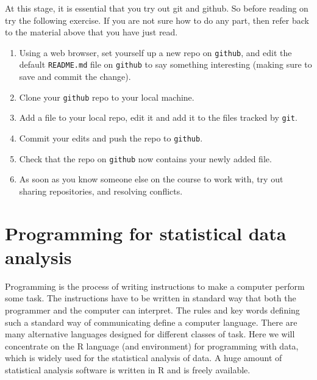 \documentclass[10pt] {article}
\theoremstyle{definition}
\begin{document}
At this stage, it is essential that you try out git and github. So before reading on try the following exercise. If you are not sure how to do any part, then refer back to the material above that you have just read.
\begin{enumerate}
\item Using a web browser, set yourself up a new repo on {\tt github}, and edit the default {\tt README.md} file on {\tt github} to say something interesting (making sure to save and commit the change).
\item Clone your {\tt github} repo to your local machine.
\item Add a file to your local repo, edit it and add it to the files tracked by {\tt git}.
\item Commit your edits and push the repo to {\tt github}.
\item Check that the repo on {\tt github} now contains your newly added file. 
\item As soon as you know someone else on the course to work with, try out sharing repositories, and resolving conflicts.
\end{enumerate}


\section{Programming for statistical data analysis}

Programming is the process of writing instructions to make a computer perform some task. The instructions have to be written in standard way that both the programmer and the computer can interpret. The rules and key words defining such a standard way of communicating define a computer language. There are many alternative languages designed for different classes of task. Here we will concentrate on the R language (and environment) for programming with data, which is widely used for the statistical analysis of data. A huge amount of statistical analysis software is written in R and is freely available. 
\end{document}
